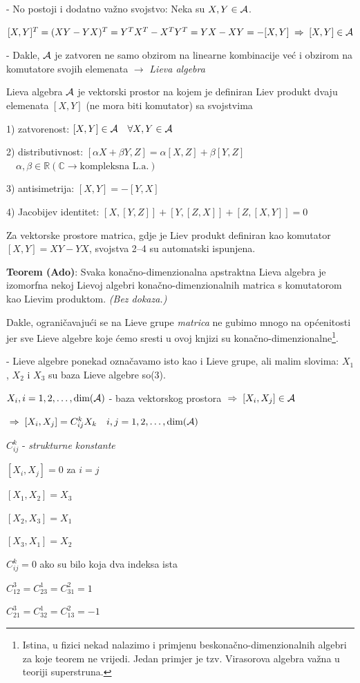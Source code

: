 - No postoji i dodatno važno svojstvo: Neka su $X,Y\in\mathcal{A}$.

$[X,Y]^T = (XY-YX)^T = Y^T X^T - X^T Y^T = YX-XY = -[X,Y] \;\Rightarrow\; [X,Y]\in\mathcal{A}$

- Dakle, $\mathcal{A}$ je zatvoren ne samo obzirom na linearne kombinacije već
   i obzirom na komutatore svojih elemenata $\to$ \emph{Lieva algebra}

\begin{definicija}
Lieva algebra $\mathcal{A}$ je vektorski prostor na kojem je definiran 
Liev produkt dvaju elemenata $[X,Y]$ (ne mora biti komutator) sa svojstvima

1) zatvorenost: $[X,Y]\in\mathcal{A} \quad \forall X,Y\in\mathcal{A}$

2) distributivnost: $[\alpha X + \beta Y, Z]=\alpha[X,Z]+\beta[Y,Z]$
$\quad \alpha,\beta \in \mathbb{R} (\mathbb{C} \to \textrm{kompleksna L.a.})$

3) antisimetrija: $[X,Y]=-[Y,X]$

4) Jacobijev identitet: $[X, [Y, Z]]+[Y, [Z, X]]+[Z, [X, Y]]=0$
\end{definicija}


Za vektorske prostore matrica, gdje je Liev produkt definiran kao
komutator $[X,Y]=XY-YX$, svojstva 2--4 su automatski ispunjena.

\textbf{Teorem (Ado)}: Svaka konačno-dimenzionalna apstraktna Lieva algebra je izomorfna nekoj
 Lievoj algebri konačno-dimenzionalnih matrica s komutatorom kao Lievim produktom. \emph{(Bez
dokaza.)}

Dakle, ograničavajući se na Lieve grupe \emph{matrica} ne gubimo mnogo
na općenitosti jer sve Lieve algebre koje ćemo sresti u ovoj knjizi su
konačno-dimenzionalne\footnote{Istina, u fizici nekad nalazimo i primjenu beskonačno-dimenzionalnih
algebri za koje teorem ne vrijedi. Jedan primjer je tzv. Virasorova algebra važna
u teoriji superstruna.}.

- Lieve algebre ponekad označavamo isto kao i Lieve grupe, ali malim slovima:
  $X_1$, $X_2$ i $X_3$ su baza Lieve algebre so(3).

$X_i, i=1,2,\ldots, \textrm{dim}(\mathcal{A})$ - baza vektorskog prostora 
  $\;\Rightarrow\; [X_i, X_j]\in\mathcal{A}$

$\;\Rightarrow\; [X_i, X_j]=C_{ij}^{k}X_k  \quad i,j=1,2,\ldots, \textrm{dim}(\mathcal{A})$

$C_{ij}^{k}$ - \emph{strukturne konstante}

\begin{primjer}
$[X_i,X_j]=0$ za $i=j$ 

$[X_1,X_2] = X_3$


$[X_2, X_3]=X_1$ 

$[X_3,X_1]=X_2$

$C_{ij}^{k}=0$ ako su bilo koja dva indeksa ista

$C_{12}^3=C_{23}^{1}=C_{31}^{2}=1$

$C_{21}^3=C_{32}^{1}=C_{13}^{2}=-1$

\end{primjer}


